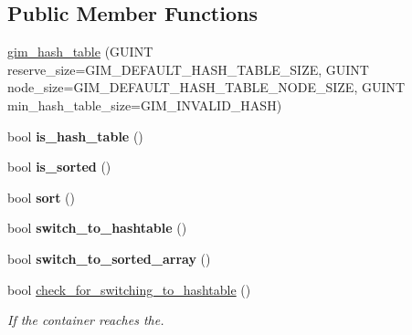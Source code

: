 \subsection*{Public Member Functions}
\begin{DoxyCompactItemize}
\item 
\hyperlink{classgim__hash__table_aefe21c907c69c8077ec0886aaa778f6f}{gim\+\_\+hash\+\_\+table} (G\+U\+I\+NT reserve\+\_\+size=G\+I\+M\+\_\+\+D\+E\+F\+A\+U\+L\+T\+\_\+\+H\+A\+S\+H\+\_\+\+T\+A\+B\+L\+E\+\_\+\+S\+I\+ZE, G\+U\+I\+NT node\+\_\+size=G\+I\+M\+\_\+\+D\+E\+F\+A\+U\+L\+T\+\_\+\+H\+A\+S\+H\+\_\+\+T\+A\+B\+L\+E\+\_\+\+N\+O\+D\+E\+\_\+\+S\+I\+ZE, G\+U\+I\+NT min\+\_\+hash\+\_\+table\+\_\+size=G\+I\+M\+\_\+\+I\+N\+V\+A\+L\+I\+D\+\_\+\+H\+A\+SH)
\item 
\mbox{\label{classgim__hash__table_ab7ab2e3e9ac09ec98d5c7112ea092aad}} 
bool {\bfseries is\+\_\+hash\+\_\+table} ()
\item 
\mbox{\label{classgim__hash__table_a075a9857030ef2630d036b57778e2a46}} 
bool {\bfseries is\+\_\+sorted} ()
\item 
\mbox{\label{classgim__hash__table_adc65cdfbdb6906e4d0ebf66766f65557}} 
bool {\bfseries sort} ()
\item 
\mbox{\label{classgim__hash__table_a02b51868862156240818dafe2f8df01d}} 
bool {\bfseries switch\+\_\+to\+\_\+hashtable} ()
\item 
\mbox{\label{classgim__hash__table_acf8117de90e6486e712fc6184ea40225}} 
bool {\bfseries switch\+\_\+to\+\_\+sorted\+\_\+array} ()
\item 
\mbox{\label{classgim__hash__table_aba33eeb9b5aa00b0d8a002c549b71ed3}} 
bool \hyperlink{classgim__hash__table_aba33eeb9b5aa00b0d8a002c549b71ed3}{check\+\_\+for\+\_\+switching\+\_\+to\+\_\+hashtable} ()
\begin{DoxyCompactList}\small\item\em If the container reaches the. \end{DoxyCompactList}\item 
\mbox{\label{classgim__hash__table_abe1662ebb0f7a17a84e7fc5d0f993c58}} 

\end{DoxyCompactItemize}
